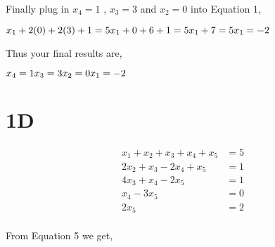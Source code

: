 \documentclass{article}
\begin{document}
\raggedright Finally plug in \begin{math} x_4 = 1 \end{math} , \begin{math} x_3 = 3 \end{math} and \begin{math} x_2 = 0 \end{math} into Equation 1, \newline

    \begin{math}
        x_1 + 2(0) + 2(3) + 1 = 5 \newline
        x_1 + 0 + 6 + 1 = 5 \newline
        x_1 + 7 = 5 \newline
        x_1 = -2 \newline
    \end{math}

    \raggedright Thus your final results are, \newline

    \begin{math}
        x_4 = 1 \newline
        x_3 = 3 \newline
        x_2 = 0 \newline
        x_1 = -2 
    \end{math}


\section*{1D}   

    \setcounter{equation}{0} %
    
    \begin{align} 
        x_1 + x_2 + x_3 + x_4 + x_5 & = 5 \\ %
        2x_2 + x_3 - 2x_4 + x_5 & = 1 \\ %
        4x_3 + x_4 - 2x_5 & = 1 \\ %
        x_4 - 3x_5 & = 0 \\ %
        2x_5 & = 2 \\ %
    \end{align}

\raggedright From Equation 5 we get, \newline
\end{document}
